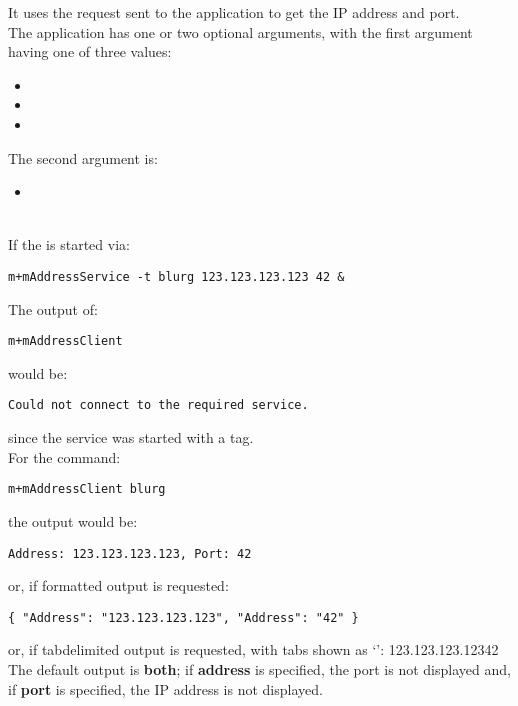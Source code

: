 It uses the  request sent to the
 application to get the IP address and port.\\

The application has one or two optional arguments, with the first argument having one of
three values:
\begin{itemize}
\item{}
\item\exSp{}
\item\exSp{}
\end{itemize}
The second argument is:
\begin{itemize}
\item{}
\end{itemize}

\insertFullClientParameters\\

If the  is started via:
\outputBegin
\begin{verbatim}
m+mAddressService -t blurg 123.123.123.123 42 &
\end{verbatim}
\outputEnd{}
The output of:
\outputBegin
\begin{verbatim}
m+mAddressClient
\end{verbatim}
\outputEnd{}
would be:
\outputBegin
\begin{verbatim}
Could not connect to the required service.
\end{verbatim}
\outputEnd{}
since the service was started with a tag.\\

For the command:
\outputBegin
\begin{verbatim}
m+mAddressClient blurg
\end{verbatim}
\outputEnd{}
the output would be:
\outputBegin
\begin{verbatim}
Address: 123.123.123.123, Port: 42
\end{verbatim}
\outputEnd{}
or, if \json\longDash{}formatted output is requested:
\outputBegin
\begin{verbatim}
{ "Address": "123.123.123.123", "Address": "42" }
\end{verbatim}
\outputEnd{}
or, if tab\longDash{}delimited output is requested, with tabs shown as `\tabSymbol':
\outputBegin{}
123.123.123.123\pseudotab{}42
\outputEnd{}
The default output is \textbf{both}; if \textbf{address} is specified, the port is not
displayed and, if \textbf{port} is specified, the IP address is not displayed.

